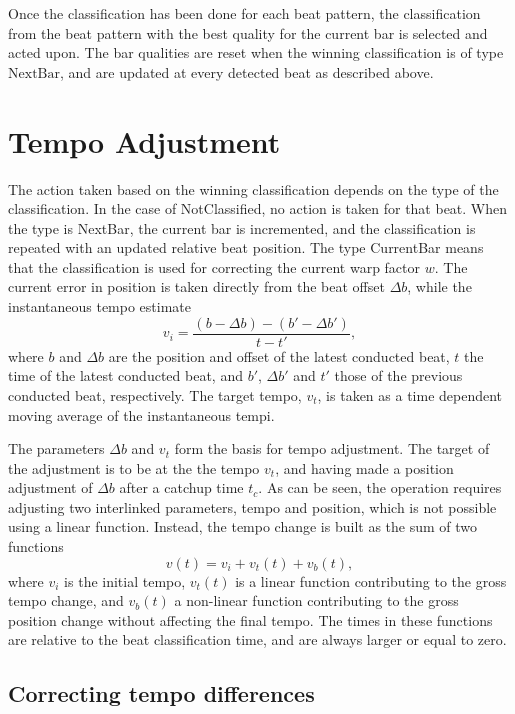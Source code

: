 Once the classification has been done for each beat pattern,
the classification from the beat pattern with the best quality for the current bar
is selected and acted upon.
The bar qualities are reset when the winning classification
is of type $\mathrm{NextBar}$,
and are updated at every detected beat as described above.

\section{Tempo Adjustment}
\label{sec:tempo_adjustment}

The action taken based on the winning classification
depends on the type of the classification.
In the case of NotClassified, no action is taken for that beat.
When the type is NextBar,
the current bar is incremented,
and the classification is repeated with an
updated relative beat position.
The type CurrentBar
means that the classification is used for correcting
the current warp factor $w$.
The current error in position is taken directly from
the beat offset $\Delta b$,
while the instantaneous tempo estimate
\begin{equation}
v_i = \frac{(b - \Delta b) - (b' - \Delta b')}{t - t'},
\end{equation}
where $b$ and $\Delta b$ are the position and offset of
the latest conducted beat,
$t$ the time of the latest conducted beat,
and $b'$, $\Delta b'$ and $t'$ those of
the previous conducted beat, respectively.
The target tempo, $v_t$, is taken as a time dependent moving average
of the instantaneous tempi.

The parameters $\Delta b$ and $v_t$
form the basis for tempo adjustment.
The target of the adjustment is to be
at the the tempo $v_t$,
and having made a position adjustment of $\Delta b$
after a catchup time $t_c$.
As can be seen,
the operation requires adjusting two interlinked parameters,
tempo and position,
which is not possible using a linear function.
Instead, the tempo change is built as the sum of two functions
\begin{equation}
v(t) = v_i + v_t(t) + v_b(t),
\end{equation}
where $v_i$ is the initial tempo,
$v_t(t)$ is a linear function
contributing to the gross tempo change,
and $v_b(t)$ a non-linear function contributing
to the gross position change
without affecting the final tempo.
The times in these functions are relative to the
beat classification time,
and are always larger or equal to zero.

\subsection{Correcting tempo differences}

